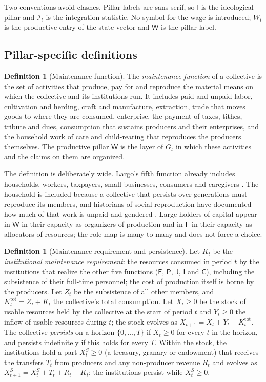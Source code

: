 \documentclass[11pt,letterpaper]{article}
\theoremstyle{definition}
\newtheorem{definition}[theorem]{Definition}
\theoremstyle{remark}
\newcommand{\pF}{\mathsf{F}}
\newcommand{\pP}{\mathsf{P}}
\newcommand{\pJ}{\mathsf{J}}
\newcommand{\pI}{\mathsf{I}}
\newcommand{\pC}{\mathsf{C}}
\newcommand{\pW}{\mathsf{W}}
\newcommand{\Integ}{\mathcal{I}}
\begin{document}
Two conventions avoid clashes. Pillar labels are sans-serif, so $\pI$ is the ideological pillar and $\Integ_t$ is the integration statistic. No symbol for the wage is introduced; $W_t$ is the productive entry of the state vector and $\pW$ is the pillar label.

\subsection{Pillar-specific definitions}

\begin{definition}[Maintenance function]
\label{def:productive-power:maintenance}
The \emph{maintenance function} of a collective is the set of activities that produce, pay for and reproduce the material means on which the collective and its institutions run. It includes paid and unpaid labor, cultivation and herding, craft and manufacture, extraction, trade that moves goods to where they are consumed, enterprise, the payment of taxes, tithes, tribute and dues, consumption that sustains producers and their enterprises, and the household work of care and child-rearing that reproduces the producers themselves. The productive pillar $\pW$ is the layer of $G_t$ in which these activities and the claims on them are organized.
\end{definition}

The definition is deliberately wide. Largo's fifth function already includes households, workers, taxpayers, small businesses, consumers and caregivers \citep{largo2026hbs}. The household is included because a collective that persists over generations must reproduce its members, and historians of social reproduction have documented how much of that work is unpaid and gendered \citep{laslett1989}. Large holders of capital appear in $\pW$ in their capacity as organizers of production and in $\pF$ in their capacity as allocators of resources; the role map is many to many and does not force a choice.

\begin{definition}[Maintenance requirement and persistence]
\label{def:productive-power:persistence}
Let $K_t$ be the \emph{institutional maintenance requirement}: the resources consumed in period $t$ by the institutions that realize the other five functions ($\pF$, $\pP$, $\pJ$, $\pI$ and $\pC$), including the subsistence of their full-time personnel; the cost of production itself is borne by the producers. Let $Z_t$ be the subsistence of all other members, and $K^{\mathrm{tot}}_t=Z_t+K_t$ the collective's total consumption. Let $X_t\ge 0$ be the stock of usable resources held by the collective at the start of period $t$ and $Y_t\ge 0$ the inflow of usable resources during $t$; the stock evolves as $X_{t+1}=X_t+Y_t-K^{\mathrm{tot}}_t$. The collective \emph{persists} on a horizon $\{0,\dots,T\}$ if $X_t\ge 0$ for every $t$ in the horizon, and persists indefinitely if this holds for every $T$. Within the stock, the institutions hold a part $X^S_t\ge 0$ (a treasury, granary or endowment) that receives the transfers $T_t$ from producers and any non-producer revenue $R_t$ and evolves as $X^S_{t+1}=X^S_t+T_t+R_t-K_t$; the institutions persist while $X^S_t\ge 0$.
\end{definition}
\end{document}
